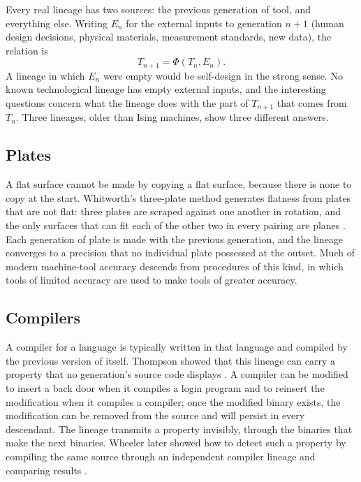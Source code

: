 \documentclass[11pt]{article}
\theoremstyle{definition}
\theoremstyle{remark}
\begin{document}
Every real lineage has two sources: the previous generation of tool, and everything else. Writing $E_n$ for the external inputs to generation $n+1$ (human design decisions, physical materials, measurement standards, new data), the relation is
\begin{equation}
T_{n+1} = \Phi(T_n, E_n).
\end{equation}
A lineage in which $E_n$ were empty would be self-design in the strong sense. No known technological lineage has empty external inputs, and the interesting questions concern what the lineage does with the part of $T_{n+1}$ that comes from $T_n$. Three lineages, older than Ising machines, show three different answers.

\subsection*{Plates}

A flat surface cannot be made by copying a flat surface, because there is none to copy at the start. Whitworth's three-plate method generates flatness from plates that are not flat: three plates are scraped against one another in rotation, and the only surfaces that can fit each of the other two in every pairing are planes \cite{moore1970}. Each generation of plate is made with the previous generation, and the lineage converges to a precision that no individual plate possessed at the outset. Much of modern machine-tool accuracy descends from procedures of this kind, in which tools of limited accuracy are used to make tools of greater accuracy.

\subsection*{Compilers}

A compiler for a language is typically written in that language and compiled by the previous version of itself. Thompson showed that this lineage can carry a property that no generation's source code displays \cite{thompson1984}. A compiler can be modified to insert a back door when it compiles a login program and to reinsert the modification when it compiles a compiler; once the modified binary exists, the modification can be removed from the source and will persist in every descendant. The lineage transmits a property invisibly, through the binaries that make the next binaries. Wheeler later showed how to detect such a property by compiling the same source through an independent compiler lineage and comparing results \cite{wheeler2009}.
\end{document}
